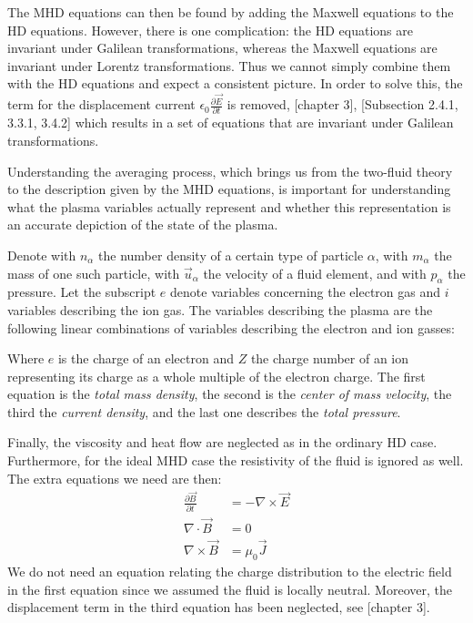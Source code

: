 The MHD equations can then be found by adding the Maxwell equations to the HD equations. However, there is one complication: the HD equations are invariant under Galilean transformations, whereas the Maxwell equations are invariant under Lorentz transformations. Thus we cannot simply combine them with the HD equations and expect a consistent picture.
In order to solve this, the term for the displacement current $\epsilon_0 \frac{\partial \vec{E}}{\partial t}$ is removed, \cite{notes-astro-fluid-dyn} [chapter 3], \cite{notes-principles-MHD}[Subsection 2.4.1, 3.3.1, 3.4.2] which results in a set of equations that are invariant under Galilean transformations.

Understanding the averaging process, which brings us from the two-fluid theory to the description given by the MHD equations, is important for understanding what the plasma variables actually represent and whether this representation is an accurate depiction of the state of the plasma.

Denote with $n_\alpha$ the number density of a certain type of particle $\alpha$, with $m_\alpha$ the mass of one such particle, with $\vec{u}_\alpha$ the velocity of a fluid element, and with $p_\alpha$ the pressure.  Let the subscript $e$ denote variables concerning the electron gas and $i$ variables describing the ion gas. The variables describing the plasma are the following linear combinations of variables describing the electron and ion gasses:

{\centering 
\noindent {}
\par}

Where $e$ is the charge of an electron and $Z$ the charge number of an ion representing its charge as a whole multiple of the electron charge. The first equation is the \emph{total mass density}, the second is the \emph{center of mass velocity}, the third the \emph{current density}, and the last one describes the \emph{total pressure}.

Finally, the viscosity and heat flow are neglected as in the ordinary HD case. Furthermore, for the ideal MHD case the resistivity of the fluid is ignored as well. The extra equations we need are then:
\begin{align*}
	\frac{\partial \vec{B}}{\partial t} &= - \nabla \times \vec{E}\\
	\nabla \cdot \vec{B} &= 0\\
	\nabla \times \vec{B} &= \mu_0 \vec{J}
\end{align*}
We do not need an equation relating the charge distribution to the electric field in the first equation since we assumed the fluid is locally neutral. Moreover, the displacement term in the third equation has been neglected, see \cite{notes-astro-fluid-dyn} [chapter 3].

